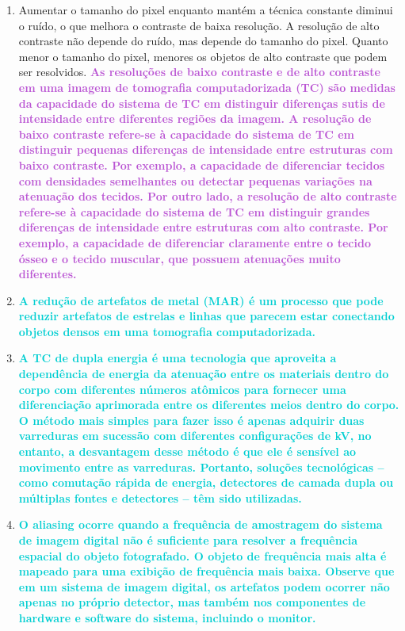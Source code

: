 \documentclass[11pt,a4paper]{article}
\newcounter{exemplo}
\begin{document}
\begin{enumerate}
        \item Aumentar o tamanho do pixel enquanto mantém a técnica constante diminui o ruído, o que melhora o contraste de baixa resolução. A resolução de alto contraste não depende do ruído, mas depende do tamanho do pixel. Quanto menor o tamanho do pixel, menores os objetos de alto contraste que podem ser resolvidos. \textcolor{MediumOrchid}{\textbf{As resoluções de baixo contraste e de alto contraste em uma imagem de tomografia computadorizada (TC) são medidas da capacidade do sistema de TC em distinguir diferenças sutis de intensidade entre diferentes regiões da imagem. A resolução de baixo contraste refere-se à capacidade do sistema de TC em distinguir pequenas diferenças de intensidade entre estruturas com baixo contraste. Por exemplo, a capacidade de diferenciar tecidos com densidades semelhantes ou detectar pequenas variações na atenuação dos tecidos. Por outro lado, a resolução de alto contraste refere-se à capacidade do sistema de TC em distinguir grandes diferenças de intensidade entre estruturas com alto contraste. Por exemplo, a capacidade de diferenciar claramente entre o tecido ósseo e o tecido muscular, que possuem atenuações muito diferentes.}}
        
        \item \textcolor{DarkTurquoise}{\textbf{A redução de artefatos de metal (MAR) é um processo que pode reduzir artefatos de estrelas e linhas que parecem estar conectando objetos densos em uma tomografia computadorizada.}} 

        \item \textcolor{DarkTurquoise}{\textbf{A TC de dupla energia é uma tecnologia que aproveita a dependência de energia da atenuação entre os materiais dentro do corpo com diferentes números atômicos para fornecer uma diferenciação aprimorada entre os diferentes meios dentro do corpo. O método mais simples para fazer isso é apenas adquirir duas varreduras em sucessão com diferentes configurações de kV, no entanto, a desvantagem desse método é que ele é sensível ao movimento entre as varreduras. Portanto, soluções tecnológicas – como comutação rápida de energia, detectores de camada dupla ou múltiplas fontes e detectores – têm sido utilizadas.}}

        \item \textcolor{DarkTurquoise}{\textbf{O aliasing ocorre quando a frequência de amostragem do sistema de imagem digital não é suficiente para resolver a frequência espacial do objeto fotografado. O objeto de frequência mais alta é mapeado para uma exibição de frequência mais baixa. Observe que em um sistema de imagem digital, os artefatos podem ocorrer não apenas no próprio detector, mas também nos componentes de hardware e software do sistema, incluindo o monitor.}} 


\end{enumerate}
\end{document}
